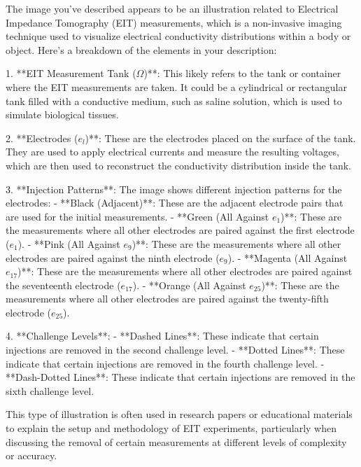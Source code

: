 The image you've described appears to be an illustration related to Electrical Impedance Tomography (EIT) measurements, which is a non-invasive imaging technique used to visualize electrical conductivity distributions within a body or object. Here's a breakdown of the elements in your description:

1. **EIT Measurement Tank ($\Omega$)**: This likely refers to the tank or container where the EIT measurements are taken. It could be a cylindrical or rectangular tank filled with a conductive medium, such as saline solution, which is used to simulate biological tissues.

2. **Electrodes ($e_l$)**: These are the electrodes placed on the surface of the tank. They are used to apply electrical currents and measure the resulting voltages, which are then used to reconstruct the conductivity distribution inside the tank.

3. **Injection Patterns**: The image shows different injection patterns for the electrodes:
   - **Black (Adjacent)**: These are the adjacent electrode pairs that are used for the initial measurements.
   - **Green (All Against $e_1$)**: These are the measurements where all other electrodes are paired against the first electrode ($e_1$).
   - **Pink (All Against $e_9$)**: These are the measurements where all other electrodes are paired against the ninth electrode ($e_9$).
   - **Magenta (All Against $e_{17}$)**: These are the measurements where all other electrodes are paired against the seventeenth electrode ($e_{17}$).
   - **Orange (All Against $e_{25}$)**: These are the measurements where all other electrodes are paired against the twenty-fifth electrode ($e_{25}$).

4. **Challenge Levels**:
   - **Dashed Lines**: These indicate that certain injections are removed in the second challenge level.
   - **Dotted Lines**: These indicate that certain injections are removed in the fourth challenge level.
   - **Dash-Dotted Lines**: These indicate that certain injections are removed in the sixth challenge level.

This type of illustration is often used in research papers or educational materials to explain the setup and methodology of EIT experiments, particularly when discussing the removal of certain measurements at different levels of complexity or accuracy.